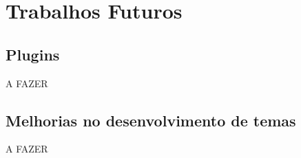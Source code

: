 \documentclass[ppginf, pep]{esinucpel}
\begin{document}
\chapter{Trabalhos Futuros}

\section{Plugins}

A FAZER

\section{Melhorias no desenvolvimento de temas}

A FAZER


%
\end{document}
